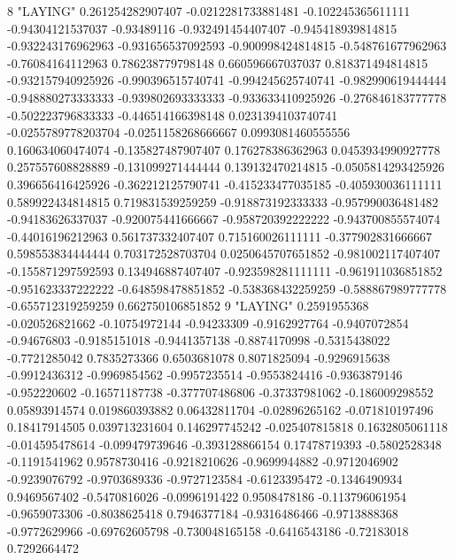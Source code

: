 8 "LAYING" 0.261254282907407 -0.0212281733881481 -0.102245365611111 -0.94304121537037 -0.93489116 -0.932491454407407 -0.945418939814815 -0.932243176962963 -0.931656537092593 -0.900998424814815 -0.548761677962963 -0.76084164112963 0.786238779798148 0.660596667037037 0.818371494814815 -0.932157940925926 -0.990396515740741 -0.994245625740741 -0.982990619444444 -0.948880273333333 -0.939802693333333 -0.933633410925926 -0.276846183777778 -0.502223796833333 -0.446514166398148 0.0231394103740741 -0.0255789778203704 -0.0251158268666667 0.0993081460555556 0.160634060474074 -0.135827487907407 0.176278386362963 0.0453934990927778 0.257557608828889 -0.131099271444444 0.139132470214815 -0.0505814293425926 0.396656416425926 -0.362212125790741 -0.415233477035185 -0.405930036111111 0.589922434814815 0.719831539259259 -0.918873192333333 -0.957990036481482 -0.94183626337037 -0.920075441666667 -0.958720392222222 -0.943700855574074 -0.44016196212963 0.561737332407407 0.715160026111111 -0.377902831666667 0.598553834444444 0.703172528703704 0.0250645707651852 -0.981002117407407 -0.155871297592593 0.134946887407407 -0.923598281111111 -0.961911036851852 -0.951623337222222 -0.648598478851852 -0.538368432259259 -0.588867989777778 -0.655712319259259 0.662750106851852
9 "LAYING" 0.2591955368 -0.020526821662 -0.10754972144 -0.94233309 -0.9162927764 -0.9407072854 -0.94676803 -0.9185151018 -0.9441357138 -0.8874170998 -0.5315438022 -0.7721285042 0.7835273366 0.6503681078 0.8071825094 -0.9296915638 -0.9912436312 -0.9969854562 -0.9957235514 -0.9553824416 -0.9363879146 -0.952220602 -0.16571187738 -0.377707486806 -0.37337981062 -0.186009298552 0.05893914574 0.019860393882 0.06432811704 -0.02896265162 -0.071810197496 0.18417914505 0.039713231604 0.146297745242 -0.025407815818 0.1632805061118 -0.014595478614 -0.099479739646 -0.393128866154 0.17478719393 -0.5802528348 -0.1191541962 0.9578730416 -0.9218210626 -0.9699944882 -0.9712046902 -0.9239076792 -0.9703689336 -0.9727123584 -0.6123395472 -0.1346490934 0.9469567402 -0.5470816026 -0.0996191422 0.9508478186 -0.113796061954 -0.9659073306 -0.8038625418 0.7946377184 -0.9316486466 -0.9713888368 -0.9772629966 -0.69762605798 -0.730048165158 -0.6416543186 -0.72183018 0.7292664472
